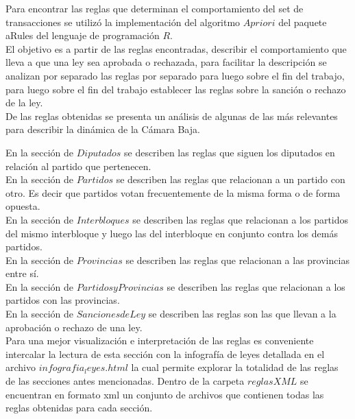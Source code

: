\documentclass{endm}
\begin{document}
Para encontrar las reglas que determinan el comportamiento del set de transacciones se utilizó la implementación del algoritmo $Apriori$ del paquete aRules del lenguaje de programación $R$.\\

El objetivo es a partir de las reglas encontradas, describir el comportamiento que lleva a que una ley sea aprobada o rechazada, para facilitar la descripción se analizan por separado las reglas por separado para luego sobre el fin del trabajo, para luego sobre el fin del trabajo establecer las reglas sobre la sanción o rechazo de la ley.\\

De las reglas obtenidas se presenta un análisis de algunas de las más relevantes para describir la dinámica de la Cámara Baja. 

En la sección de $Diputados$ se describen las reglas que siguen los diputados en relación al partido que pertenecen.\\

En la sección de $Partidos$ se describen las reglas que relacionan a un partido con otro. Es decir que partidos votan frecuentemente de la misma forma o de forma opuesta.\\

En la sección de $Interbloques$ se describen las reglas que relacionan a los partidos del mismo interbloque y luego las del interbloque en conjunto contra los demás partidos.\\

En la sección de $Provincias$ se describen las reglas que relacionan a las provincias entre sí.\\

En la sección de $Partidos y Provincias$ se describen las reglas que relacionan a los partidos con las provincias.\\

En la sección de $Sanciones de Ley$ se describen las reglas son las que llevan a la aprobación o rechazo de una ley.\\

Para una mejor visualización e interpretación de las reglas es conveniente intercalar la lectura de esta sección con la infografía de leyes detallada en el archivo \textbf{$infografia_leyes.html$} la cual permite explorar la totalidad de las reglas de las secciones antes mencionadas. Dentro de la carpeta \textbf{$reglas XML$} se encuentran en formato xml un conjunto de archivos que contienen todas las reglas obtenidas para cada sección.\\
\end{document}
